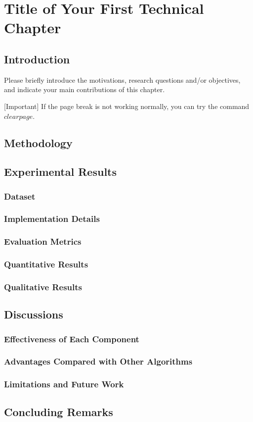 \chapter{Title of Your First Technical Chapter}
\label{chap:chapter_3}

\section{Introduction}


Please briefly introduce the motivations, research questions and/or objectives, and indicate your main contributions of this chapter.

[Important] If the page break is not working normally, you can try the command $clearpage$.

\clearpage

\section{Methodology}

\section{Experimental Results}

\subsection{Dataset}
\subsection{Implementation Details}
\subsection{Evaluation Metrics}
\subsection{Quantitative Results}
\subsection{Qualitative Results}


\section{Discussions}
\subsection{Effectiveness of Each Component}
\subsection{Advantages Compared with Other Algorithms}

\subsection{Limitations and Future Work}

\section{Concluding Remarks}

